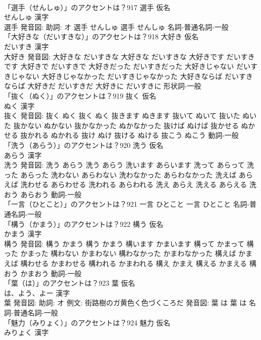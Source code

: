 \documentclass[8pt]{extreport}
\begin{document}
\begin{CJK}{UTF8}{min}
\\	「選手（せんしゅ）」のアクセントは？917	選手 仮名　
\\	せんしゅ 漢字　
\\	選手 発音図: 助詞: オ	選手 せんしゅ		選手 せんしゅ				名詞-普通名詞-一般 
\\	「大好きな（だいすきな）」のアクセントは？918	大好き 仮名　
\\	だいすき 漢字　
\\	大好き 発音図:	大好きな だいすきな		大好きな だいすきな 大好きです だいすきです 大好きで だいすきで 大好きだった だいすきだった 大好きじゃない だいすきじゃない 大好きじゃなかった だいすきじゃなかった 大好きならば だいすきならば 大好きだ だいすきだ 大好きに だいすきに				形状詞-一般 
\\	「抜く（ぬく）」のアクセントは？919	抜く 仮名　
\\	ぬく 漢字　
\\	抜く 発音図:	抜く ぬく		抜く ぬく 抜きます ぬきます 抜いて ぬいて 抜いた ぬいた 抜かない ぬかない 抜かなかった ぬかなかった 抜けば ぬけば 抜かせる ぬかせる 抜かれる ぬかれる 抜け ぬけ 抜ける ぬける 抜こう ぬこう				動詞-一般 
\\	「洗う（あらう）」のアクセントは？920	洗う 仮名　
\\	あらう 漢字　
\\	洗う 発音図:	洗う あらう		洗う あらう 洗います あらいます 洗って あらって 洗った あらった 洗わない あらわない 洗わなかった あらわなかった 洗えば あらえば 洗わせる あらわせる 洗われる あらわれる 洗え あらえ 洗える あらえる 洗おう あらおう				動詞-一般 
\\	「一言（ひとこと）」のアクセントは？921		一言 ひとこと		一言 ひとこと				名詞-普通名詞-一般 
\\	「構う（かまう）」のアクセントは？922	構う 仮名　
\\	かまう 漢字　
\\	構う 発音図:	構う かまう		構う かまう 構います かまいます 構って かまって 構った かまった 構わない かまわない 構わなかった かまわなかった 構えば かまえば 構わせる かまわせる 構われる かまわれる 構え かまえ 構える かまえる 構おう かまおう				動詞-一般 
\\	「葉（は）」のアクセントは？923	葉 仮名　
\\	は、よう、よー 漢字　
\\	葉 発音図: 助詞: オ 例文: 街路樹のガ黄色く色づくころだ 発音図:	葉 は		葉 は				名詞-普通名詞-一般 
\\	「魅力（みりょく）」のアクセントは？924	魅力 仮名　
\\	みりょく 漢字　

\end{CJK}
\end{document}
